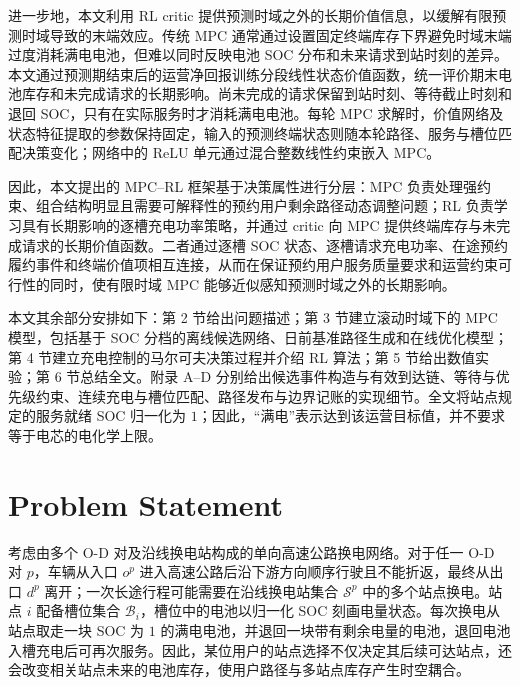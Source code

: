 \documentclass[12pt,a4paper,UTF8]{ctexart}
\begin{document}
进一步地，本文利用 RL critic 提供预测时域之外的长期价值信息，以缓解有限预测时域导致的末端效应。传统 MPC 通常通过设置固定终端库存下界避免时域末端过度消耗满电电池，但难以同时反映电池 SOC 分布和未来请求到站时刻的差异。本文通过预测期结束后的运营净回报训练分段线性状态价值函数，统一评价期末电池库存和未完成请求的长期影响。尚未完成的请求保留到站时刻、等待截止时刻和退回 SOC，只有在实际服务时才消耗满电电池。每轮 MPC 求解时，价值网络及状态特征提取的参数保持固定，输入的预测终端状态则随本轮路径、服务与槽位匹配决策变化；网络中的 ReLU 单元通过混合整数线性约束嵌入 MPC。

因此，本文提出的 MPC--RL 框架基于决策属性进行分层：MPC 负责处理强约束、组合结构明显且需要可解释性的预约用户剩余路径动态调整问题；RL 负责学习具有长期影响的逐槽充电功率策略，并通过 critic 向 MPC 提供终端库存与未完成请求的长期价值函数。二者通过逐槽 SOC 状态、逐槽请求充电功率、在途预约履约事件和终端价值项相互连接，从而在保证预约用户服务质量要求和运营约束可行性的同时，使有限时域 MPC 能够近似感知预测时域之外的长期影响。


本文其余部分安排如下：第 2 节给出问题描述；第 3 节建立滚动时域下的 MPC 模型，包括基于 SOC 分档的离线候选网络、日前基准路径生成和在线优化模型；第 4 节建立充电控制的马尔可夫决策过程并介绍 RL 算法；第 5 节给出数值实验；第 6 节总结全文。附录 A--D 分别给出候选事件构造与有效到达链、等待与优先级约束、连续充电与槽位匹配、路径发布与边界记账的实现细节。全文将站点规定的服务就绪 SOC 归一化为 $1$；因此，“满电”表示达到该运营目标值，并不要求等于电芯的电化学上限。






\section{Problem Statement}

考虑由多个 O-D 对及沿线换电站构成的单向高速公路换电网络。对于任一 O-D 对 $p$，车辆从入口 $o^p$ 进入高速公路后沿下游方向顺序行驶且不能折返，最终从出口 $d^p$ 离开；一次长途行程可能需要在沿线换电站集合 $\mathcal S^p$ 中的多个站点换电。站点 $i$ 配备槽位集合 $\mathcal B_i$，槽位中的电池以归一化 SOC 刻画电量状态。每次换电从站点取走一块 SOC 为 $1$ 的满电电池，并退回一块带有剩余电量的电池，退回电池入槽充电后可再次服务。因此，某位用户的站点选择不仅决定其后续可达站点，还会改变相关站点未来的电池库存，使用户路径与多站点库存产生时空耦合。
\end{document}
